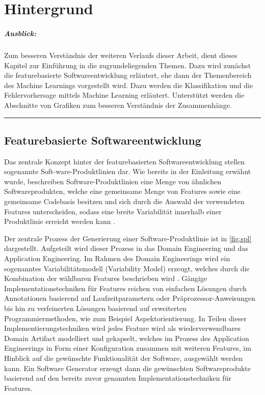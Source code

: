 
\chapter{Hintergrund}
\label{background}

\paragraph{Ausblick:}
Zum besseren Verständnis der weiteren Verlaufs dieser Arbeit, dient dieses Kapitel zur Einführung in die zugrundeliegenden Themen. Dazu wird zunächst die featurebasierte Softwareentwicklung erläutert, ehe dann der Themenbereich des Machine Learnings vorgestellt wird. Dazu werden die Klassifikation und die Fehlervorhersage mittels Machine Learning erläutert. Unterstützt werden die Abschnitte von Grafiken zum besseren Verständnis der Zusammenhänge.
\\
\hrule

\section{Featurebasierte Softwareentwicklung}
\label{feat-develop}

Das zentrale Konzept hinter der featurebasierten Softwareentwicklung stellen sogenannte Soft-ware-Produktlinien dar. Wie bereits in der Einleitung erwähnt wurde, beschreiben Software-Produktlinien eine Menge von ähnlichen Softwareprodukten, welche eine gemeinsame Menge von Features sowie eine gemeinsame Codebasis besitzen und sich durch die Auswahl der verwendeten Features unterscheiden, sodass eine breite Variabilität innerhalb einer Produktlinie erreicht werden kann \cite{Apel2013,Thuem2014}.

Der zentrale Prozess der Generierung einer Software-Produktlinie ist in \autoref{fig:spl} dargestellt. Aufgeteilt wird dieser Prozess in das Domain Engineering und das Application Engineering. Im Rahmen des Domain Engineerings wird ein sogenanntes Variabilitätsmodell (Variability Model) erzeugt, welches durch die Kombination der wählbaren Features beschrieben wird \cite{Apel2013}. Gängige Implementationstechniken für Features reichen von einfachen Lösungen durch Annotationen basierend auf Laufzeitparametern oder Präprozessor-Anweisungen bis hin zu verfeinerten Lösungen basierend auf erweiterten Programmiermethoden, wie zum Beispiel Aspektorientierung. In Teilen dieser Implementierungstechniken wird jedes Feature wird als wiederverwendbares Domain Artifact modelliert und gekapselt, welches im Prozess des Application Engineerings in Form einer Konfiguration zusammen mit weiteren Features, im Hinblick auf die gewünschte Funktionalität der Software, ausgewählt werden kann. Ein Software Generator erzeugt dann die gewünschten Softwareprodukte basierend auf den bereits zuvor genannten Implementationstechniken für Features.

